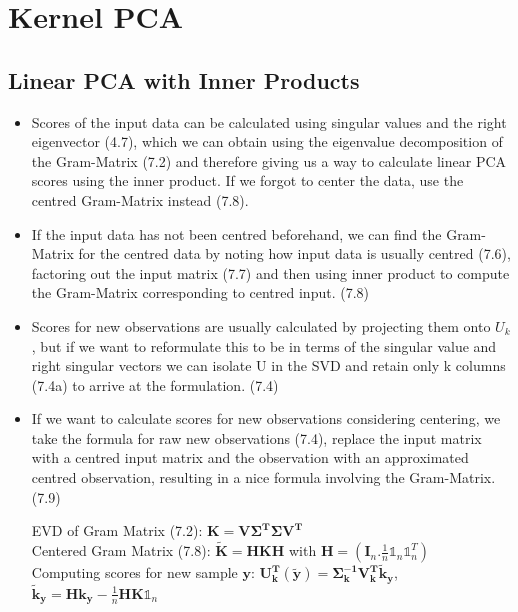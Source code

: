 \documentclass[english]{latex4ei/latex4ei_sheet}
\begin{document}
\section{Kernel PCA}
\begin{sectionbox}
\subsection{Linear PCA with Inner Products}
\begin{itemize}
\item Scores of the input data can be calculated using singular values and the right eigenvector (4.7), which we can obtain using the eigenvalue decomposition of the Gram-Matrix (7.2) and therefore giving us a way to calculate linear PCA scores using the inner product. If we forgot to center the data, use the centred Gram-Matrix instead (7.8).

\item If the input data has not been centred beforehand, we can find the Gram-Matrix for the centred data by noting how input data is usually centred (7.6), factoring out the input matrix (7.7) and then using inner product to compute the Gram-Matrix  corresponding to centred input. (7.8)
\item Scores for new observations are usually calculated by projecting them onto $U_k$, but if we want to reformulate this to be in terms of the singular value and right singular vectors we can isolate U in the SVD and retain only k columns (7.4a) to arrive at the formulation. (7.4)
\item If we want to calculate scores for new observations considering centering, we take the formula for raw new observations (7.4), replace the input matrix with a centred input matrix and the observation with an approximated centred observation, resulting in a nice formula involving the Gram-Matrix. (7.9)
\begin{emphbox}
    EVD of Gram Matrix (7.2): $\mathbf{K=V\Sigma^T\Sigma V^T}$\\
    Centered Gram Matrix (7.8): $\mathbf{\tilde{K}=HKH}$ with $\mathbf{H}=(\mathbf{I}_n.\frac{1}{n}\mathds{1}_n\mathds{1}_n^T)$\\
    Computing scores for new sample $\mathbf{y}$:
    $\mathbf{U_k^T}(\mathbf{\tilde{y}})=\mathbf{\Sigma_k^{-1}V_k^T\tilde{k}_y}$, \quad $\mathbf{\tilde{k}_y=Hk_y-}\frac{1}{n}\mathbf{HK}\mathds{1}_n$
\end{emphbox}

\end{itemize}
\end{sectionbox}
\end{document}
